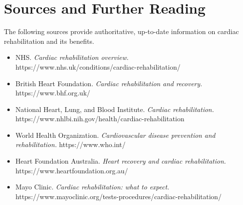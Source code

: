 \section*{Sources and Further Reading}
The following sources provide authoritative, up-to-date information on cardiac rehabilitation and its benefits.
\begin{itemize}
    \item NHS. \textit{Cardiac rehabilitation overview.} https://www.nhs.uk/conditions/cardiac-rehabilitation/
    \item British Heart Foundation. \textit{Cardiac rehabilitation and recovery.} https://www.bhf.org.uk/
    \item National Heart, Lung, and Blood Institute. \textit{Cardiac rehabilitation.} https://www.nhlbi.nih.gov/health/cardiac-rehabilitation
    \item World Health Organization. \textit{Cardiovascular disease prevention and rehabilitation.} https://www.who.int/
    \item Heart Foundation Australia. \textit{Heart recovery and cardiac rehabilitation.} https://www.heartfoundation.org.au/
    \item Mayo Clinic. \textit{Cardiac rehabilitation: what to expect.} https://www.mayoclinic.org/tests-procedures/cardiac-rehabilitation/
\end{itemize}
